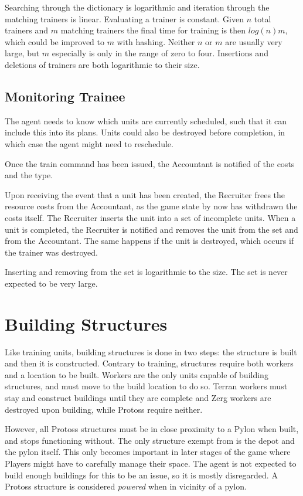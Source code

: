 	Searching through the dictionary is logarithmic and iteration through the matching trainers is linear. Evaluating a trainer is constant. Given $n$ total trainers and $m$ matching trainers the final time for training is then $log(n)m$, which could be improved to $m$ with hashing. Neither $n$ or $m$ are usually very large, but $m$ especially is only in the range of zero to four. Insertions and deletions of trainers are both logarithmic to their size.

	\subsection*{Monitoring Trainee}
	The agent needs to know which units are currently scheduled, such that it can include this into its plans. Units could also be destroyed before completion, in which case the agent might need to reschedule.
	
	Once the train command has been issued, the Accountant is notified of the costs and the type.
	
	Upon receiving the event that a unit has been created, the Recruiter frees the resource costs from the Accountant, as the game state by now has withdrawn the costs itself. The Recruiter inserts the unit into a set of incomplete units. When a unit is completed, the Recruiter is notified and removes the unit from the set and from the Accountant. The same happens if the unit is destroyed, which occurs if the trainer was destroyed.
	
	Inserting and removing from the set is logarithmic to the size. The set is never expected to be very large.

\section{Building Structures}
Like training units, building structures is done in two steps: the structure is built and then it is constructed. Contrary to training, structures require both workers and a location to be built. Workers are the only units capable of building structures, and must move to the build location to do so. Terran workers must stay and construct buildings until they are complete and Zerg workers are destroyed upon building, while Protoss require neither.

However, all Protoss structures must be in close proximity to a Pylon when built, and stops functioning without. The only structure exempt from is the depot and the pylon itself. This only becomes important in later stages of the game where Players might have to carefully manage their space. The agent is not expected to build enough buildings for this to be an issue, so it is mostly disregarded. A Protoss structure is considered \emph{powered} when in vicinity of a pylon.

